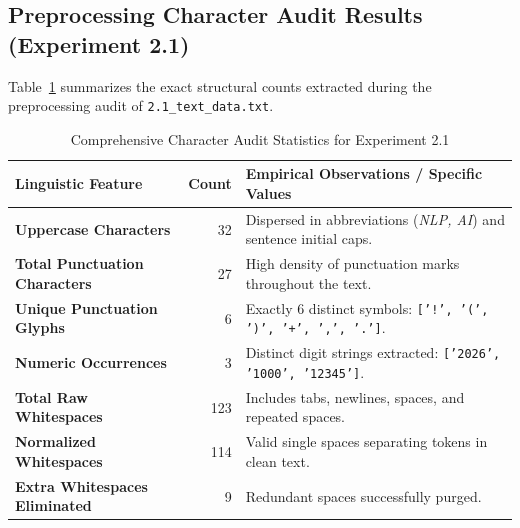 \documentclass[12pt,a4paper]{report}
\begin{document}
\subsection{Preprocessing Character Audit Results (Experiment 2.1)}
Table~\ref{tab:exp2_audit_results} summarizes the exact structural counts extracted during the preprocessing audit of \texttt{2.1\_text\_data.txt}.
\begin{table}[H]
\centering
\small
\caption{Comprehensive Character Audit Statistics for Experiment 2.1}
\label{tab:exp2_audit_results}
\begin{tabular}{lrl}
\toprule
\textbf{Linguistic Feature} & \textbf{Count} & \textbf{Empirical Observations / Specific Values} \\
\midrule
\textbf{Uppercase Characters} & 32 & Dispersed in abbreviations (\textit{NLP, AI}) and sentence initial caps. \\
\textbf{Total Punctuation Characters} & 27 & High density of punctuation marks throughout the text. \\
\textbf{Unique Punctuation Glyphs} & 6 & Exactly 6 distinct symbols: \texttt{['!', '(', ')', '+', ',', '.']}. \\
\textbf{Numeric Occurrences} & 3 & Distinct digit strings extracted: \texttt{['2026', '1000', '12345']}. \\
\textbf{Total Raw Whitespaces} & 123 & Includes tabs, newlines, spaces, and repeated spaces. \\
\textbf{Normalized Whitespaces} & 114 & Valid single spaces separating tokens in clean text. \\
\textbf{Extra Whitespaces Eliminated} & 9 & Redundant spaces successfully purged. \\
\bottomrule
\end{tabular}
\end{table}
\end{document}
